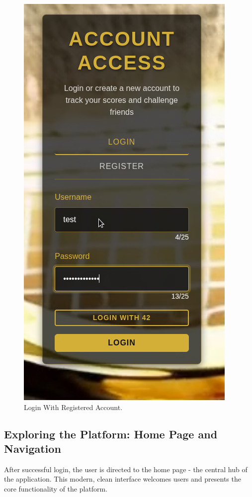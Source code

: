 \begin{figure}[H]
    \centering
    \includegraphics[width=0.6\linewidth]{Figures/images/new_images/LoginWithRegisterdAccount.png}
    \caption{Login With Registered Account.} %
    \label{fig:login-registered-wireframe}
\end{figure}

\subsection{Exploring the Platform: Home Page and Navigation}

After successful login, the user is directed to the home page - the central hub of the application. This modern, clean interface welcomes users and presents the core functionality of the platform.

